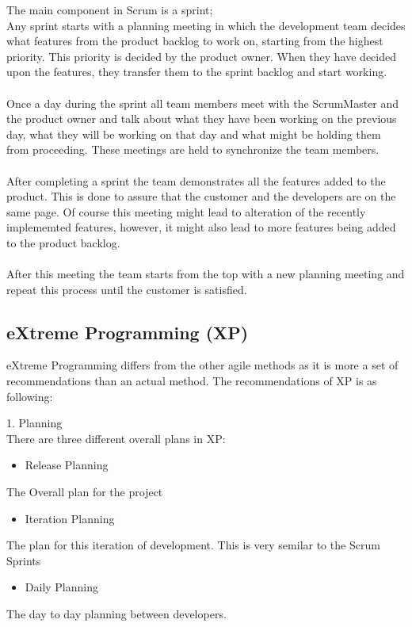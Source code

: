 The main component in Scrum is a sprint; \\
Any sprint starts with a planning meeting in which the development team decides what features from the product backlog to work on, starting from the highest priority. This priority is decided by the product owner. When they have decided upon the features, they transfer them to the sprint backlog and start working. \\
\\
Once a day during the sprint all team members meet with the ScrumMaster and the product owner and talk about what they have been working on the previous day, what they will be working on that day and what might be holding them from proceeding. These meetings are held to synchronize the team members.\\
\\
After completing a sprint the team demonstrates all the features added to the product. This is done to assure that the customer and the developers are on the same page. Of course this meeting might lead to alteration of the recently implememted features, however, it might also lead to more features being added to the product backlog.\\
\\
After this meeting the team starts from the top with a new planning meeting and repeat this process until the customer is satisfied.

\subsection{eXtreme Programming (XP)}
eXtreme Programming differs from the other agile methods as it is more a set of recommendations than an actual method. The recommendations of XP is as following:


1. Planning\\
There are three different overall plans in XP:

\begin{itemize}
	\item Release Planning
\end{itemize}
The Overall plan for the project
\begin{itemize}
	\item Iteration Planning
\end{itemize}
The plan for this iteration of development. This is very semilar to the Scrum Sprints
\begin{itemize}
	\item Daily Planning
\end{itemize}
The day to day planning between developers.
\\

